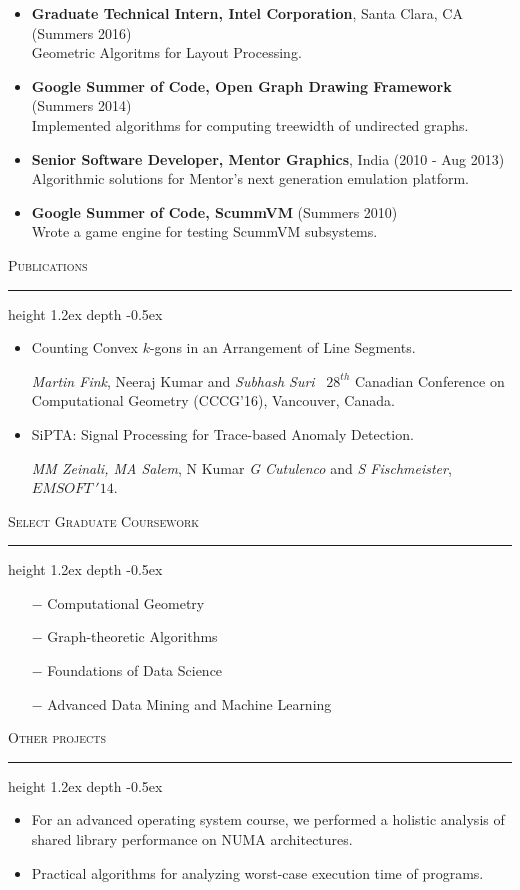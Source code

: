 \documentclass[11pt]{article}
\def\Vhrulefill{\leavevmode\leaders\hrule height 1.2ex depth \dimexpr2pt-0.5ex\hfill\kern0pt}
\begin{document}
{\begin{itemize}
	\item \textbf{Graduate Technical Intern, Intel Corporation}, Santa Clara, CA \hfill(Summers 2016) \\
        Geometric Algoritms for Layout Processing.
	
    \item \textbf{Google Summer of Code, Open Graph Drawing Framework} \hfill(Summers 2014) \\
		Implemented algorithms for computing treewidth of undirected graphs.

	\item \textbf{Senior Software Developer, Mentor Graphics}, India \hfill(2010 - Aug 2013) \\
		Algorithmic solutions for Mentor's next generation emulation platform.
	
	\item \textbf{Google Summer of Code, ScummVM} \hfill(Summers 2010) \\
		Wrote a game engine for testing ScummVM subsystems.
\end{itemize}

\medskip
\noindent\textsc{Publications}
\textcolor{mygray}{\noindent\Vhrulefill}
\begin{itemize}
    \item Counting Convex $k$-gons in an Arrangement of Line Segments. 
    
        \emph{Martin Fink}, Neeraj Kumar and \emph{Subhash Suri}~
        $28^{th}$ Canadian Conference on Computational Geometry (CCCG'16), Vancouver, Canada.

    \item SiPTA: Signal Processing for Trace-based Anomaly Detection.

        \emph{MM Zeinali, MA Salem}, N Kumar \emph{G Cutulenco} and \emph{S Fischmeister}, $EMSOFT~'14$.
\end{itemize}

\noindent\textsc{Select Graduate Coursework}
\textcolor{mygray}{\noindent\Vhrulefill}
\medskip
\begin{itemize}
    \item[$-$] Computational Geometry
    \item[$-$] Graph-theoretic Algorithms
    \item[$-$] Foundations of Data Science
    \item[$-$] Advanced Data Mining and Machine Learning
\end{itemize}

\medskip
\noindent\textsc{Other projects}
\textcolor{mygray}{\noindent\Vhrulefill}
\begin{itemize}
	\item For an advanced operating system course, we performed a holistic analysis of shared library performance on NUMA architectures.
	\item Practical algorithms for analyzing worst-case execution time of programs.
\end{itemize}

}
\end{document}
